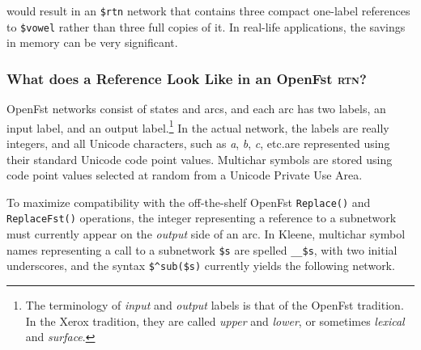 \documentclass[letterpaper,12pt]{article}
\newcommand{\acro}{\textsc}
\begin{document}
\noindent
would result in an \verb!$rtn! network that contains three compact
one-label references to \verb!$vowel! rather than three full copies of
it.  In real-life applications, the savings in memory can be very
significant.

\subsubsection{What does a Reference Look Like in an OpenFst \acro{rtn}?}

OpenFst networks consist of states and arcs, and each arc has two labels,
an input label, and an output label.\footnote{The terminology of
\emph{input} and \emph{output} labels is that of the OpenFst tradition.
In the Xerox tradition, they are called \emph{upper} and \emph{lower}, or
sometimes \emph{lexical} and \emph{surface}.}  In the actual network, the
labels are really integers, and all Unicode characters, such as \emph{a},
\emph{b}, \emph{c}, etc.\@ are represented using their standard Unicode
code point values.  Multichar symbols are stored using code point values
selected at random from a Unicode Private Use Area.

To maximize compatibility with the off-the-shelf OpenFst
\texttt{Replace()} and \texttt{ReplaceFst()} operations, the integer
representing a reference to a subnetwork must currently appear on the
\emph{output} side of an arc.  In Kleene, multichar symbol names
representing a call to a subnetwork \verb!$s! are spelled \verb!__$s!,
with two initial underscores, and the syntax \verb!$^sub($s)!  currently
yields the following network.
\end{document}
